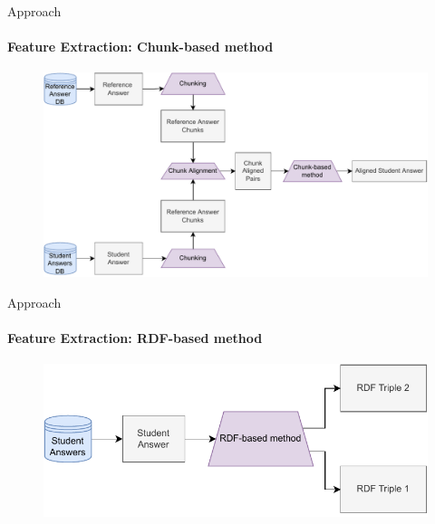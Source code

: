 \documentclass[aspectratio=169]{beamer}
\begin{document}
\begin{frame}{Approach}
\framesubtitle{Feature Extraction: Chunk-based method}
\begin{figure}
	\centering
	\includegraphics[scale = 0.5]{images/chunk_FE_slides.pdf}
	\label{fig:chunk fe}
\end{figure}
\end{frame}
\begin{frame}{Approach}
\framesubtitle{Feature Extraction: RDF-based method}
\begin{figure}
	\centering
	\includegraphics[scale = 0.65]{images/RDF_FE_slides.pdf}
	\label{fig:rdf fe}
\end{figure}
\end{frame}
\end{document}
